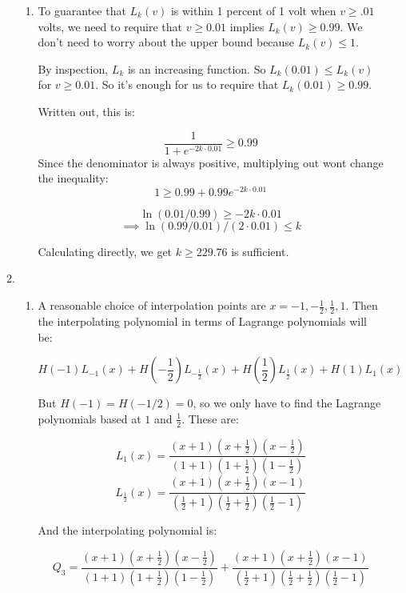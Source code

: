 \begin{enumerate}
\begin{enumerate}
\begin{enumerate}
			            \item To guarantee that $L_k(v)$ is within 1 percent of 1 volt when $v \geq .01$ volts, we need to require that $v\geq 0.01 $ implies $L_k(v)\geq 0.99$. We don't need to worry about the upper bound because $L_k(v) \leq 1$.

			                  By inspection, $L_k$ is an increasing function. So $L_k(0.01)\leq L_k(v)$ for $v \geq 0.01$. So it's enough for us to require that $L_k(0.01)\geq 0.99$.

			                  Written out, this is:

			                  \[\frac{1}{1+e^{-2k\cdot 0.01}} \geq 0.99\]
			                  Since the denominator is always positive, multiplying out wont change the inequality:
			                  \[1 \geq 0.99 + 0.99 e^{-2k \cdot 0.01}\]

			                  \[\ln(0.01/0.99) \geq -2k\cdot 0.01\]
			                  \[\implies \ln(0.99/0.01)/(2\cdot 0.01)\leq k\]

			                  Calculating directly, we get $k\geq 229.76$ is sufficient.

		            \end{enumerate}
		      \item
		            \begin{enumerate}
			            \item A reasonable choice of interpolation points are $x = -1,-\frac{1}{2},\frac{1}{2},1$. Then the interpolating polynomial in terms of Lagrange polynomials will be:

			                  \[H(-1)L_{-1}(x) + H(-\frac{1}{2})L_{-\frac{1}{2}}(x) + H(\frac{1}{2})L_{\frac{1}{2}}(x) + H(1)L_1(x)\]

			                  But $H(-1) = H(-1/2) = 0$, so we only have to find the Lagrange polynomials based at $1$ and $\frac{1}{2}$. These are:

			                  \[L_1(x)=\frac{(x+1)(x+\frac{1}{2})(x-\frac{1}{2})}{(1+1)(1+\frac{1}{2})(1-\frac{1}{2})}\]
			                  \[L_{\frac{1}{2}}(x) = \frac{(x+1)(x+\frac{1}{2})(x-1)}{(\frac{1}{2}+1)(\frac{1}{2}+\frac{1}{2})(\frac{1}{2}-1)}\]

			                  And the interpolating polynomial is:

			                  \[Q_3 = \frac{(x+1)(x+\frac{1}{2})(x-\frac{1}{2})}{(1+1)(1+\frac{1}{2})(1-\frac{1}{2})} +\frac{(x+1)(x+\frac{1}{2})(x-1)}{(\frac{1}{2}+1)(\frac{1}{2}+\frac{1}{2})(\frac{1}{2}-1)}\]


\end{enumerate}
\end{enumerate}
\end{enumerate}
